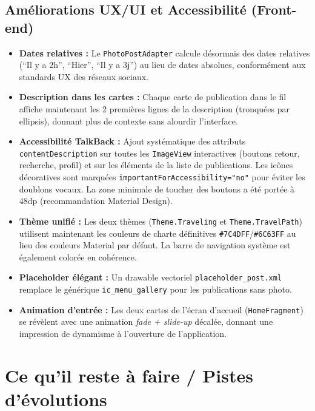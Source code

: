 \documentclass[11pt,a4paper]{article}
\begin{document}
\subsection{Améliorations UX/UI et Accessibilité (Front-end)}
\begin{itemize}[label=\textcolor{primary}{\textbullet}]
    \item \textbf{Dates relatives :} Le \texttt{PhotoPostAdapter} calcule désormais des dates relatives (``Il y a 2h'', ``Hier'', ``Il y a 3j'') au lieu de dates absolues, conformément aux standards UX des réseaux sociaux.
    
    \item \textbf{Description dans les cartes :} Chaque carte de publication dans le fil affiche maintenant les 2 premières lignes de la description (tronquées par ellipsis), donnant plus de contexte sans alourdir l'interface.
    
    \item \textbf{Accessibilité TalkBack :} Ajout systématique des attributs \texttt{contentDescription} sur toutes les \texttt{ImageView} interactives (boutons retour, recherche, profil) et sur les éléments de la liste de publications. Les icônes décoratives sont marquées \texttt{importantForAccessibility="no"} pour éviter les doublons vocaux. La zone minimale de toucher des boutons a été portée à 48dp (recommandation Material Design).
    
    \item \textbf{Thème unifié :} Les deux thèmes (\texttt{Theme.Traveling} et \texttt{Theme.TravelPath}) utilisent maintenant les couleurs de charte définitives \texttt{\#7C4DFF}/\texttt{\#6C63FF} au lieu des couleurs Material par défaut. La barre de navigation système est également colorée en cohérence.
    
    \item \textbf{Placeholder élégant :} Un drawable vectoriel \texttt{placeholder\_post.xml} remplace le générique \texttt{ic\_menu\_gallery} pour les publications sans photo.
    
    \item \textbf{Animation d'entrée :} Les deux cartes de l'écran d'accueil (\texttt{HomeFragment}) se révèlent avec une animation \textit{fade + slide-up} décalée, donnant une impression de dynamisme à l'ouverture de l'application.
\end{itemize}

\section{Ce qu'il reste à faire / Pistes d'évolutions}
\end{document}
